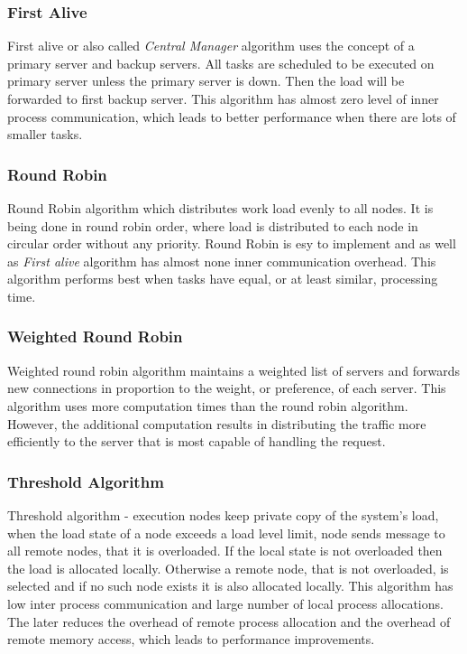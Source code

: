 \subsubsection{First Alive}
First alive or also called \textit{Central Manager} algorithm uses the concept of a primary server and backup servers\cite{web:ibmLoadBalancingDecisions}.
All tasks are scheduled to be executed on primary server unless the primary server is down.
Then the load will be forwarded to first backup server.
This algorithm has almost zero level of inner process communication, which leads to better performance when there are lots of smaller tasks.

\subsubsection{Round Robin}
Round Robin algorithm which distributes work load evenly to all nodes.
It is being done in round robin order, where load is distributed to each node in circular order without any priority.
Round Robin is esy to implement and as well as \textit{First alive} algorithm has almost none inner communication overhead.
This algorithm performs best when tasks have equal, or at least similar, processing time.

\subsubsection{Weighted Round Robin}
Weighted round robin algorithm maintains a weighted list of servers and forwards new connections in proportion to the weight, or preference,
of each server.
This algorithm uses more computation times than the round robin algorithm.
However, the additional computation results in distributing the traffic more efficiently to the server that is most capable of handling the request\cite{web:ibmLoadBalancingDecisions}.

\subsubsection{Threshold Algorithm}
Threshold algorithm - execution nodes keep private copy of the system's load, when the load state of a node exceeds a load level limit,
node sends message to all remote nodes, that it is overloaded.
If the local state is not overloaded then the load is allocated locally.
Otherwise a remote node, that is not overloaded, is selected and if no such node exists it is also allocated locally.
This algorithm has low inter process communication and large number of local process allocations.
The later reduces the overhead of remote process allocation and the overhead of remote memory access,
which leads to performance improvements\cite{web:staticAndDynamicLoadBalancing}.

